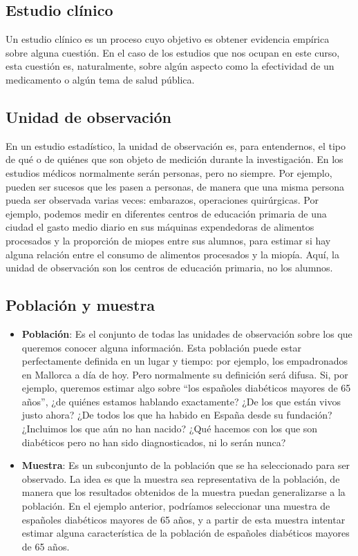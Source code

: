 \documentclass[
  letterpaper,
  DIV=11,
  numbers=noendperiod]{scrreprt}
\begin{document}
\subsection{Estudio clínico}\label{estudio-cluxednico}

Un estudio clínico es un proceso cuyo objetivo es obtener evidencia
empírica sobre alguna cuestión. En el caso de los estudios que nos
ocupan en este curso, esta cuestión es, naturalmente, sobre algún
aspecto como la efectividad de un medicamento o algún tema de salud
pública.

\subsection{Unidad de observación}\label{unidad-de-observaciuxf3n}

En un estudio estadístico, la unidad de observación es, para
entendernos, el tipo de qué o de quiénes que son objeto de medición
durante la investigación. En los estudios médicos normalmente serán
personas, pero no siempre. Por ejemplo, pueden ser sucesos que les pasen
a personas, de manera que una misma persona pueda ser observada varias
veces: embarazos, operaciones quirúrgicas. Por ejemplo, podemos medir en
diferentes centros de educación primaria de una ciudad el gasto medio
diario en sus máquinas expendedoras de alimentos procesados y la
proporción de miopes entre sus alumnos, para estimar si hay alguna
relación entre el consumo de alimentos procesados y la miopía. Aquí, la
unidad de observación son los centros de educación primaria, no los
alumnos.

\subsection{Población y muestra}\label{poblaciuxf3n-y-muestra}

\begin{itemize}
\item
  \textbf{Población}: Es el conjunto de todas las unidades de
  observación sobre los que queremos conocer alguna información. Esta
  población puede estar perfectamente definida en un lugar y tiempo: por
  ejemplo, los empadronados en Mallorca a día de hoy. Pero normalmente
  su definición será difusa. Si, por ejemplo, queremos estimar algo
  sobre ``los españoles diabéticos mayores de 65 años'', ¿de quiénes
  estamos hablando exactamente? ¿De los que están vivos justo ahora? ¿De
  todos los que ha habido en España desde su fundación? ¿Incluimos los
  que aún no han nacido? ¿Qué hacemos con los que son diabéticos pero no
  han sido diagnosticados, ni lo serán nunca?
\item
  \textbf{Muestra}: Es un subconjunto de la población que se ha
  seleccionado para ser observado. La idea es que la muestra sea
  representativa de la población, de manera que los resultados obtenidos
  de la muestra puedan generalizarse a la población. En el ejemplo
  anterior, podríamos seleccionar una muestra de españoles diabéticos
  mayores de 65 años, y a partir de esta muestra intentar estimar alguna
  característica de la población de españoles diabéticos mayores de 65
  años.
\end{itemize}
\end{document}
